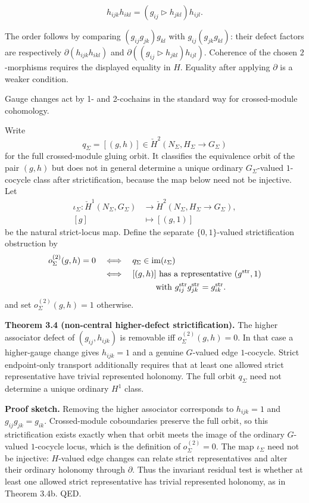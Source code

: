 \[
h_{ijk} h_{ikl} = (g_{ij} \triangleright h_{jkl}) h_{ijl}.
\]

The order follows by comparing \((g_{ij}g_{jk})g_{kl}\) with
\(g_{ij}(g_{jk}g_{kl})\): their defect factors are respectively
\(\partial(h_{ijk}h_{ikl})\) and
\(\partial((g_{ij}\triangleright h_{jkl})h_{ijl})\).
Coherence of the chosen \(2\)-morphisms requires the displayed equality in
\(H\). Equality after applying \(\partial\) is a weaker condition.

Gauge changes act by 1- and 2-cochains in the standard way for crossed-module cohomology.

Write
\[
q_\Sigma=[(g,h)]\in\check H^2(N_\Sigma,H_\Sigma\to G_\Sigma)
\]
for the full crossed-module gluing orbit. It classifies the equivalence orbit of the pair \((g,h)\)
but does not in general determine a unique ordinary \(G_\Sigma\)-valued \(1\)-cocycle class after
strictification, because the map below need not be injective. Let
\[
\begin{aligned}
\iota_\Sigma:\check H^1(N_\Sigma,G_\Sigma)
&\longrightarrow\check H^2(N_\Sigma,H_\Sigma\to G_\Sigma),\\
[g]&\longmapsto[(g,1)]
\end{aligned}
\]
be the natural strict-locus map. Define the separate \(\{0,1\}\)-valued strictification obstruction by
\[
\begin{aligned}
o^{(2)}_\Sigma(g,h)=0
&\quad\Longleftrightarrow\quad q_\Sigma\in\operatorname{im}(\iota_\Sigma)\\
&\quad\Longleftrightarrow\quad [(g,h)]\text{ has a representative }(g^{\mathrm{str}},1)\\
&\hspace{7.2em}\text{with }g^{\mathrm{str}}_{ij}g^{\mathrm{str}}_{jk}=g^{\mathrm{str}}_{ik}.
\end{aligned}
\]
and set \(o^{(2)}_\Sigma(g,h)=1\) otherwise.

\textbf{Theorem 3.4 (non-central higher-defect strictification).} The higher associator defect of
\((g_{ij},h_{ijk})\) is removable iff \(o^{(2)}_\Sigma(g,h)=0\). In that case a higher-gauge change
gives \(h_{ijk}=1\) and a genuine \(G\)-valued edge \(1\)-cocycle. Strict endpoint-only transport
additionally requires that at least one allowed strict representative have trivial represented
holonomy. The full orbit \(q_\Sigma\) need not determine a unique ordinary \(H^1\) class.

\textbf{Proof sketch.} Removing the higher associator corresponds to \(h_{ijk}=1\) and
\(g_{ij}g_{jk}=g_{ik}\). Crossed-module coboundaries preserve the full orbit, so this
strictification exists exactly when that orbit meets the image of the ordinary \(G\)-valued
\(1\)-cocycle locus, which is the definition of \(o^{(2)}_\Sigma=0\). The map \(\iota_\Sigma\)
need not be injective: \(H\)-valued edge changes can relate strict representatives and alter their
ordinary holonomy through \(\partial\). Thus the invariant residual test is whether at least one
allowed strict representative has trivial represented holonomy, as in Theorem 3.4b. QED.


